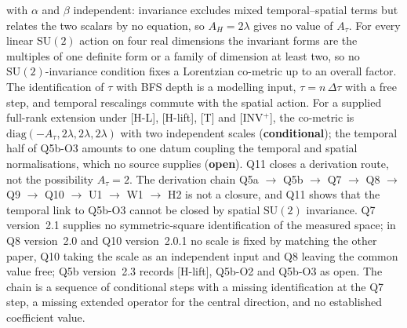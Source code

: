 \documentclass[11pt,a4paper]{article}
\newcommand{\SU}{\mathrm{SU}}
\newcommand{\sopen}{\textcolor{copen}{\textbf{open}}}
\newcommand{\scond}{\textcolor{ccond}{\textbf{conditional}}}
\begin{document}
    with $\alpha$ and $\beta$ independent: invariance excludes mixed temporal--spatial terms but relates the two
    scalars by no equation, so $A_H = 2\lambda$ gives no value of $A_\tau$.
    For every linear $\SU(2)$ action on four real dimensions the invariant forms are the multiples of one definite
    form or a family of dimension at least two, so no $\SU(2)$-invariance condition fixes a Lorentzian co-metric up
    to an overall factor.
    The identification of $\tau$ with BFS depth is a modelling input, $\tau = n\,\Delta\tau$ with a free step, and
    temporal rescalings commute with the spatial action.
    For a supplied full-rank extension under [H-L], [H-lift], [T] and [INV$^+$], the co-metric is
    $\mathrm{diag}(-A_\tau, 2\lambda, 2\lambda, 2\lambda)$
    with two independent scales (\scond); the temporal half of Q5b-O3 amounts to one datum coupling the temporal and
    spatial normalisations, which no source supplies (\sopen).
    Q11 closes a derivation route, not the possibility $A_\tau = 2$.
    The derivation chain Q5a $\to$ Q5b $\to$ Q7 $\to$ Q8 $\to$ Q9 $\to$ Q10 $\to$ U1 $\to$ W1 $\to$ H2 is not a
    closure, and Q11 shows that the temporal link to Q5b-O3 cannot be closed by spatial $\SU(2)$ invariance.
    Q7 version~2.1 supplies no symmetric-square identification of the measured space; in Q8 version~2.0 and
    Q10 version~2.0.1 no scale is fixed by matching the other paper, Q10 taking the scale as an independent input and
    Q8 leaving the common value free; Q5b version~2.3 records [H-lift], Q5b-O2 and Q5b-O3 as open.
    The chain is a sequence of conditional steps with a missing identification at the Q7 step, a missing
    extended operator for the central direction, and no established coefficient value.
\end{document}
